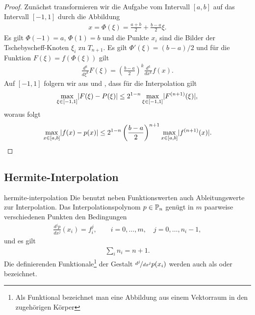 \begin{proof}
  Zunächst transformieren wir die Aufgabe vom Intervall $[a,b]$ auf
  das Intervall $[-1,1]$ durch die Abbildung
  \begin{gather}
    x = \Phi(\xi) = \frac{a+b}2 + \frac{b-a}2 \xi.
  \end{gather}
  Es gilt $\Phi(-1) = a$, $\Phi(1)=b$ und die Punkte $x_i$ sind die
  Bilder der Tschebyscheff-Knoten $\xi_i$ zu $T_{n+1}$. Es gilt
  $\Phi'(\xi) = (b-a)/2$ und für die Funktion $F(\xi) = f(\Phi(\xi))$
  gilt
  \begin{gather}
    \frac{d^k}{d\xi^k} F(\xi) = \left(\frac{b-a}2\right)^k
    \frac{d^k}{dx^k} f(x).
  \end{gather}
  Auf $[-1,1]$ folgern wir aus  und
  , dass für die Interpolation gilt
  \begin{gather}
    \max_{\xi\in[-1,1]} \abs{F(\xi) - P(\xi)}
    \le 2^{1-n} \max_{\xi\in[-1,1]}\abs{F^{(n+1)}(\xi)},
  \end{gather}
  woraus folgt
  \begin{gather}
    \max_{x\in[a,b]} \abs{f(x) - p(x)}
    \le 2^{1-n} \left(\frac{b-a}2\right)^{n+1} \max_{x\in[a,b]}\abs{f^{(n+1)}(x)}.
  \end{gather}  
\end{proof}

\subsection{Hermite-Interpolation}

\begin{Definition}{hermite-interpolation}
  Die  benutzt neben Funktionswerten
  auch Ableitungswerte zur Interpolation. Das Interpolationspolynom
  $p\in \P_n$ genügt in $m$ paarweise verschiedenen Punkten den
  Bedingungen
  \begin{gather}
    \frac{d^j p}{dx^j}(x_i) = f_i^{j},
    \qquad i = 0,\dots, m, \quad j=0,\dots,n_i-1,
  \end{gather}
  und es gilt
  \begin{gather}
    \sum_{i} n_i = n+1.
  \end{gather}
  Die definierenden Funktionale\footnote{Als Funktional bezeichnet man
    eine Abbildung aus einem Vektorraum in den zugehörigen Körper} der Gestalt
  $\nicefrac{d^j}{dx^j} p(x_i)$ werden auch als 
  oder  bezeichnet.
\end{Definition}

